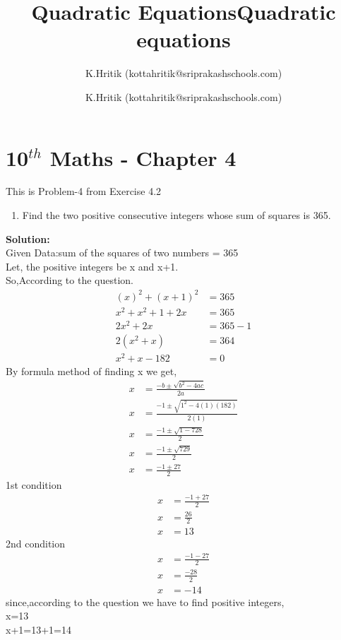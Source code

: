 \documentclass[12pt]{article}
\title{Quadratic Equations}
\author{ K.Hritik (kottahritik@sriprakashschools.com)}
\title{Quadratic equations}
\author{K.Hritik (kottahritik@sriprakashschools.com)}
\newcommand{\solution}{\noindent \textbf{Solution: }}
\begin{document}
\section*{10$^{th}$ Maths - Chapter 4}
This is Problem-4 from Exercise 4.2
\begin{enumerate}
\item Find the two positive consecutive integers whose sum of squares is 365.
\end{enumerate}
\solution \\
Given Data:sum of the squares of two numbers = 365\\
Let, the positive integers be x and x+1.\\
So,According to the question.
\begin{align}
(x)^{2} + (x+1)^{2} &= 365 \\
x^{2} + x^{2} + 1 + 2x &= 365 \\
2x^{2} +2x &= 365 -1\\
2(x^{2} +x) &= 364\\
x^{2} + x - 182 &= 0
\end{align}
By formula method of finding x we get,\\
\begin{align}
x &= \frac{-b\pm\sqrt{b^2-4ac}}{2a}\\
x &= \frac{-1\pm\sqrt{1^2-4(1)(182)}}{2(1)}\\
x &= \frac{-1 \pm\sqrt{1-728}}{2}\\
x &= \frac{-1 \pm\sqrt{729}}{2}\\
x &= \frac{-1 \pm 27}{2}
\end{align}
1st condition
\begin{align}
x &=\frac{-1 + 27}{2}\\
x &=\frac{26}{2}\\ 
x &=13
\end{align}
2nd condition 
\begin{align}
x &= \frac{-1 - 27}{2}\\
x &=\frac{-28}{2}\\
x &= -14
\end{align}
since,according to the question we have to find positive integers,\\
x=13\\
x+1=13+1=14\\
\end{document}
